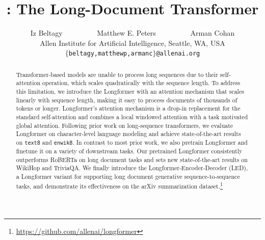 \documentclass[11pt,a4paper]{article}
\title{\model: The Long-Document Transformer}
\author{
Iz Beltagy\Thanks{\enspace Equal contribution.}
~~~~~~~~~Matthew E. Peters\textcolor{darkblue}{\footnotemark[1]}
~~~~~~~~~Arman Cohan\textcolor{darkblue}{\footnotemark[1]}\\
Allen Institute for Artificial Intelligence, Seattle, WA, USA\\
{\tt $\{$beltagy,matthewp,armanc$\}$@allenai.org}\\}
\date{}
\newcommand{\model}{Longformer\xspace}
\newcommand{\ib}[1]{\textcolor{teal}{[#1 ({\bf IB})]}}
\begin{document}
\maketitle
\begin{abstract}
Transformer-based models are unable to process long sequences due to their self-attention operation, which scales quadratically with the sequence length.
To address this limitation, we introduce the \model with an attention mechanism that scales linearly with sequence length, making it easy to process documents of thousands of tokens or longer.
\model's attention mechanism is a drop-in replacement for the standard self-attention and combines a local windowed attention with a task motivated global attention.
Following prior work on long-sequence transformers, 
we evaluate \model on character-level language modeling
and achieve state-of-the-art results on \texttt{text8} and \texttt{enwik8}.
In contrast to most prior work,
we also pretrain \model
and finetune it on a variety of downstream tasks.
Our pretrained \model consistently outperforms RoBERTa on long document tasks
and sets new state-of-the-art results on WikiHop and
TriviaQA. We finally introduce the Longformer-Encoder-Decoder (LED), a Longformer variant for supporting long document generative sequence-to-sequence tasks, and demonstrate its effectiveness on the arXiv summarization dataset.\footnote{\url{https://github.com/allenai/longformer}}


\end{abstract}
\end{document}
